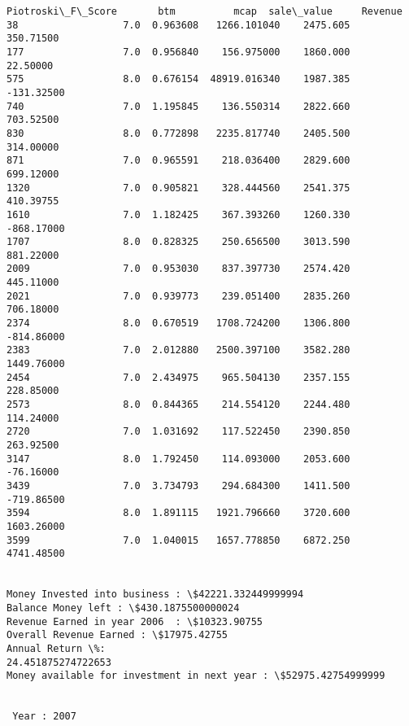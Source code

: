 \documentclass[11pt]{article}
\begin{document}
\begin{Verbatim}[commandchars=\\\{\}]
      Piotroski\_F\_Score       btm          mcap  sale\_value     Revenue
38                  7.0  0.963608   1266.101040    2475.605   350.71500
177                 7.0  0.956840    156.975000    1860.000    22.50000
575                 8.0  0.676154  48919.016340    1987.385  -131.32500
740                 7.0  1.195845    136.550314    2822.660   703.52500
830                 8.0  0.772898   2235.817740    2405.500   314.00000
871                 7.0  0.965591    218.036400    2829.600   699.12000
1320                7.0  0.905821    328.444560    2541.375   410.39755
1610                7.0  1.182425    367.393260    1260.330  -868.17000
1707                8.0  0.828325    250.656500    3013.590   881.22000
2009                7.0  0.953030    837.397730    2574.420   445.11000
2021                7.0  0.939773    239.051400    2835.260   706.18000
2374                8.0  0.670519   1708.724200    1306.800  -814.86000
2383                7.0  2.012880   2500.397100    3582.280  1449.76000
2454                7.0  2.434975    965.504130    2357.155   228.85000
2573                8.0  0.844365    214.554120    2244.480   114.24000
2720                7.0  1.031692    117.522450    2390.850   263.92500
3147                8.0  1.792450    114.093000    2053.600   -76.16000
3439                7.0  3.734793    294.684300    1411.500  -719.86500
3594                8.0  1.891115   1921.796660    3720.600  1603.26000
3599                7.0  1.040015   1657.778850    6872.250  4741.48500


Money Invested into business : \$42221.332449999994
Balance Money left : \$430.1875500000024
Revenue Earned in year 2006  : \$10323.90755
Overall Revenue Earned : \$17975.42755
Annual Return \%:
24.451875274722653
Money available for investment in next year : \$52975.42754999999


 Year : 2007


\end{Verbatim}
\end{document}
